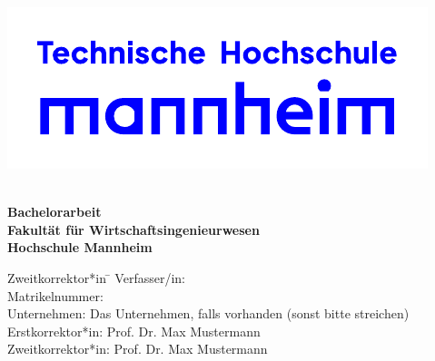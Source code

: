 \begin{titlepage}
		\vspace{-2cm}
		\centering\noindent\includegraphics[scale=1.0]{img/thmannheimlogo.pdf}

\vspace{3em}

\begin{center}
	{\textbf{\Large{}\TheThesisTitle}}\\[5em]
	{\textbf{\large{}Bachelorarbeit}}\\[2em]
	{\textbf{Fakultät für Wirtschaftsingenieurwesen}\\[.5em] \textbf{Hochschule Mannheim}}
	
	\vspace{3em}
\vfill

\begin{minipage}{\textwidth}

\begin{tabbing}
	Zweitkorrektor*in \hspace{0.85cm}\=\kill
	Verfasser/in: \> \TheThesisAuthor \\[1.5mm]
	Matrikelnummer:  \\[1.5mm]
	Unternehmen: \> Das Unternehmen, falls vorhanden (sonst bitte streichen)  \\[1.5mm]
	Erstkorrektor*in: \> Prof. Dr. Max Mustermann \\[1.5mm]
	Zweitkorrektor*in: \> Prof. Dr. Max Mustermann \\[1.5mm]

\end{tabbing}
\end{minipage}

\end{center}

\end{titlepage}